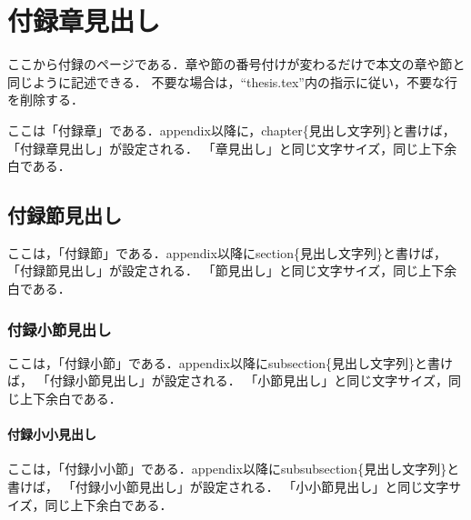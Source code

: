 \documentclass[11pt]{icsthesis}
\begin{document}
\chapter{付録章見出し}
ここから付録のページである．章や節の番号付けが変わるだけで本文の章や節と同じように記述できる．
不要な場合は，``\textsf{thesis.tex}''内の指示に従い，不要な行を削除する．

ここは「付録章」である．\textsf{\yen appendix}以降に，\textsf{\yen chapter\{見出し文字列\}}と書けば，
「付録章見出し」が設定される．
「章見出し」と同じ文字サイズ，同じ上下余白である．

\section{付録節見出し}
ここは，「付録節」である．\textsf{\yen appendix}以降に\textsf{\yen section\{見出し文字列\}}と書けば，
「付録節見出し」が設定される．
「節見出し」と同じ文字サイズ，同じ上下余白である．

\subsection{付録小節見出し}
ここは，「付録小節」である．\textsf{\yen appendix}以降に\textsf{\yen subsection\{見出し文字列\}}と書けば，
「付録小節見出し」が設定される．
「小節見出し」と同じ文字サイズ，同じ上下余白である．

\subsubsection{付録小小見出し}
ここは，「付録小小節」である．\textsf{\yen appendix}以降に\textsf{\yen subsubsection\{見出し文字列\}}と書けば，
「付録小小節見出し」が設定される．
「小小節見出し」と同じ文字サイズ，同じ上下余白である．
\end{document}
